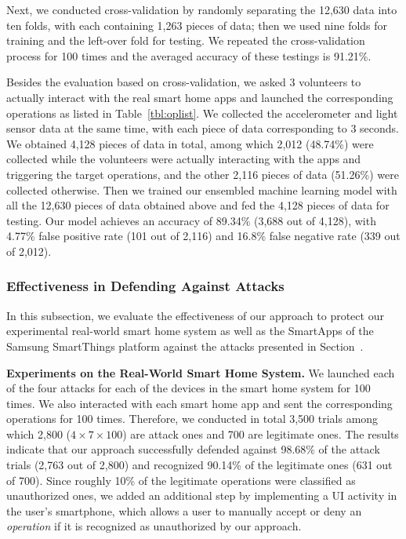 \documentclass[letterpaper,12pt]{article}
\begin{document}
Next, we conducted cross-validation by randomly separating the 12,630 data into ten folds, with each containing 1,263 pieces of data; then we used nine folds for training and the left-over fold for testing. We repeated the cross-validation process for 100 times and the averaged accuracy of these testings is 91.21\%.

Besides the evaluation based on cross-validation, we asked 3 volunteers to actually interact with the real smart home apps and launched the corresponding operations as listed in Table~\ref{tbl:oplist}. We collected the accelerometer and light sensor data at the same time, with each piece of data corresponding to 3 seconds. We obtained 4,128 pieces of data in total, among which 2,012 (48.74\%) were collected while the volunteers were actually interacting with the apps and triggering the target operations, and the other 2,116 pieces of data (51.26\%) were collected otherwise. Then we trained our ensembled machine learning model with all the 12,630 pieces of data obtained above and fed the 4,128 pieces of data for testing. Our model achieves an accuracy of 89.34\% (3,688 out of 4,128), with 4.77\% false positive rate (101 out of 2,116) and 16.8\% false negative rate (339 out of 2,012).

\subsubsection{Effectiveness in Defending Against Attacks}
In this subsection, we evaluate the effectiveness of our approach to protect our experimental real-world smart home system as well as the SmartApps of the Samsung SmartThings platform against the attacks presented in Section~.

\textbf{Experiments on the Real-World Smart Home System.} 
We launched each of the four attacks for each of the devices in the smart home system for 100 times. We also interacted with each smart home app and sent the corresponding operations for 100 times. Therefore, we conducted in total 3,500 trials among which 2,800 ($4\times 7\times 100$) are attack ones and 700 are legitimate ones. The results indicate that our approach successfully defended against 98.68\% of the attack trials (2,763 out of 2,800) and recognized 90.14\% of the legitimate ones (631 out of 700). Since roughly 10\% of the legitimate operations were classified as unauthorized ones, we added an additional step by implementing a UI activity in the user's smartphone, which allows a user to manually accept or deny an \textit{operation} if it is recognized as unauthorized by our approach.
\end{document}
